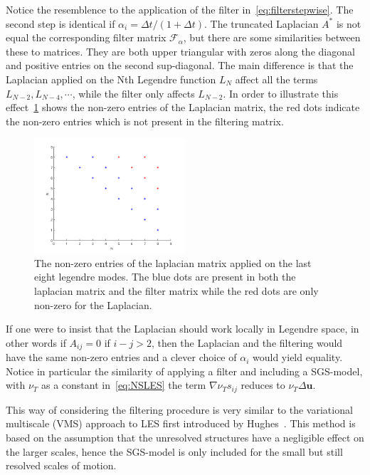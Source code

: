 Notice the resemblence to the application of the filter in~\ref{eq:filterstepwise}. The second step
is identical if $\alpha_i = \Delta t/(1+\Delta t)$. The truncated Laplacian $A^*$ is not equal the corresponding
filter matrix $\mathcal{F}_{\alpha}$, but there are some similarities between these to matrices.
They are both upper triangular with zeros along the diagonal and positive entries on the second 
sup-diagonal. The main difference is that the Laplacian applied on the Nth Legendre function 
$L_N$ affect all the terms $L_{N-2},L_{N-4},\cdots$, while the filter only affects $L_{N-2}$.
In order to illustrate this effect~\ref{fig:entries} shows the non-zero entries of the
Laplacian matrix, the red dots indicate the non-zero entries which is not present in the filtering
matrix.
%
\begin{figure}[h]
	\centering
	\includegraphics[width=0.5\textwidth]{Figures/matrix.png}
	\caption{The non-zero entries of the laplacian matrix applied on the last eight legendre modes.
    The blue dots are present in both the laplacian matrix and the filter matrix
    while the red dots are only non-zero for the Laplacian.}
	\label{fig:entries}
\end{figure}
%
If one were to insist that the Laplacian should work locally in Legendre space, in other words 
if $A_{ij}=0$ if $i-j>2$, then the Laplacian and the filtering would have the same non-zero entries 
and a clever choice of $\alpha_i$ would yield equality. Notice in particular the similarity of 
applying a filter and including a SGS-model, with $\nu_T$ as a constant in~\ref{eq:NSLES} the term 
$\nabla \nu_Ts_{ij}$ reduces to $\nu_T\Delta \mathbf{u}$.

This way of considering the filtering procedure is very similar to the variational multiscale (VMS) 
approach to LES first introduced by Hughes~\cite{Hughes}. This method is based on the assumption that
the unresolved structures have a negligible effect on the larger scales, hence the SGS-model is 
only included for the small but still resolved scales of motion.

